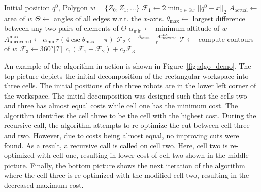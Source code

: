 \documentclass[../main.tex]{subfiles}
\begin{document}
\begin{algorithm}
	\caption{$\text{compute\_}\chi(q^0, w)$}
	\label{alg:metric_algorithm}
	\begin{algorithmic}[1]
		\REQUIRE Initial position $q^0$, Polygon $w=\{Z_0,Z_1,\ldots\}$ 
		\STATE $\mathcal{F}_1\gets2\min_{x\in\partial w}||q^0-x||_2$ \label{line:min_dist}
		\STATE $A_\text{actual}\gets$ area of $w$	\label{line:area}
		\STATE $\Theta\gets$ angles of all edges w.r.t. the $x$-axis.	\label{line:all_edge}
		\STATE $\theta_{\max}\gets$ largest difference between any two pairs of elements of $\Theta$ \label{line:all_pairs}
		\STATE $\alpha_{\min}\gets$ minimum altitude of $w$	\label{line:multi_alt}
		\STATE $A^{\max}_{\text{uncovered}}\gets\alpha_{\min}r(4\csc{\theta_{\max}}-\pi)$ \label{line:a_uncovered}
		\STATE $\mathcal{F}_2\gets\frac{A_\text{actual}-A^{\max}_{\text{uncovered}}}{r}$
		\STATE $\mathcal{T}\gets$ compute contours of $w$	\label{line:contours}
		\STATE $\mathcal{F}_3\gets360^o|\mathcal{T}|$
		\RETURN $c_1(\mathcal{F}_1+\mathcal{F}_2)+c_2\mathcal{F}_3$
	\end{algorithmic}
\end{algorithm}

An example of the algorithm in action is shown in Figure~\ref{fig:algo_demo}. The top picture depicts the initial decomposition of the rectangular workspace into three cells. The initial positions of the three robots are in the lower left corner of the workspace. The initial decomposition was designed such that the cells two and three has almost equal costs while cell one has the minimum cost. The algorithm identifies the cell three to be the cell with the highest cost. During the recursive call, the algorithm attempts to re-optimize the cut between cell three and two. However, due to costs being almost equal, no improving cuts were found. As a result, a recursive call is called on cell two. Here, cell two is re-optimized with cell one, resulting in lower cost of cell two shown in the middle picture. Finally, the bottom picture shows the next iteration of the algorithm where the cell three is re-optimized with the modified cell two, resulting in the decreased maximum cost. 
\end{document}
